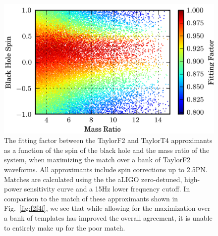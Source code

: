 \begin{figure}
\begin{center}
\includegraphics{papers/nsbh_faithfulness/figure13.png}
\end{center}
\caption{\label{fig:spin2q}The fitting factor between the TaylorF2 and
TaylorT4 approximants as a function of the spin of the black hole
and the mass ratio of the system, when maximizing the match over a bank of
TaylorF2 waveforms. All approximants include spin corrections up to 2.5\ac{PN}.
Matches are calculated using the the aLIGO
zero-detuned, high-power sensitivity curve and a 15Hz lower frequency cutoff. In 
comparison to the match of these approximants shown in Fig.~\ref{fig:f2f4f}, we see that
while allowing for the maximization over a bank of templates has improved the overall agreement, 
it is unable to entirely make up for the poor match. 
}
\end{figure}

